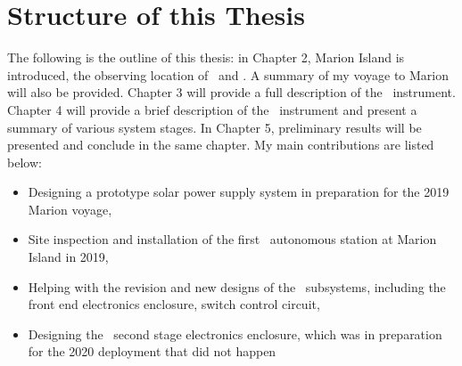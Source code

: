 \section{Structure of this Thesis}


The following is the outline of this thesis: in Chapter 2, 
Marion Island is introduced, the observing location of \prizm\ and \albatros. A summary of my voyage to Marion will also be provided. Chapter 3 will provide a full description of the \albatros\ instrument. Chapter 4 will provide a brief description of the \prizm\ instrument and present a summary of various system stages. In Chapter 5, preliminary results will be presented and conclude in the same chapter. My main contributions are listed below:
\begin{itemize}
	\item Designing a prototype solar power supply system in preparation for the 2019 Marion voyage, 
	\item Site inspection and installation of the first \albatros\ autonomous station at Marion Island in 2019,
	\item Helping with the revision and new designs of the \prizm\ subsystems, including the front end electronics enclosure, switch control circuit, 
	\item Designing the \prizm\ second stage electronics enclosure, which was in preparation for the 2020 deployment that did not happen
\end{itemize}